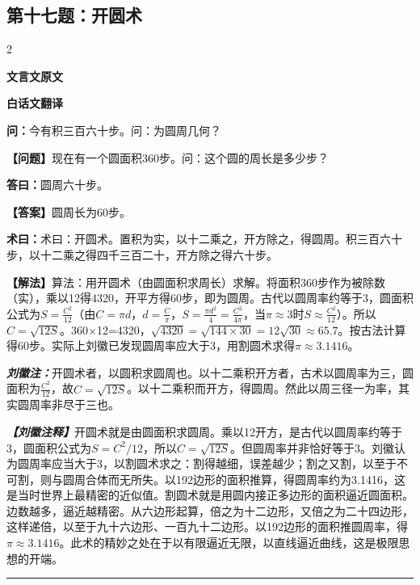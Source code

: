 \documentclass[10pt,a4paper]{article}
\newcommand{\wen}[1]{\textbf{\color{problemcolor}问：}#1\par}
\newcommand{\da}[1]{\textbf{答曰：}#1\par}
\newcommand{\shu}[1]{\textbf{术曰：}#1\par}
\newcommand{\liuhui}[1]{{\color{commentarycolor}\textit{\textbf{刘徽注：}}#1\par}}
\newcommand{\classicalheader}[1]{{\centering\large\bfseries\color{classicalcolor} #1\par\vspace{0.5em}}}
\newcommand{\wenmodern}[1]{\textbf{\color{moderncolor}【问题】}#1\par}
\newcommand{\damodern}[1]{\textbf{【答案】}#1\par}
\newcommand{\shumodern}[1]{\textbf{【解法】}#1\par}
\newcommand{\liuhuimodern}[1]{{\color{commentarycolor}\textit{\textbf{【刘徽注释】}}#1\par}}
\newcommand{\modernheader}[1]{{\centering\large\bfseries\color{moderncolor} #1\par\vspace{0.5em}}}
\newcommand{\problemsec}[1]{\subsection*{#1}}
\begin{document}
\problemsec{第十七题：开圆术}
\begin{paracol}{2}
\classicalheader{文言文原文}
\switchcolumn
\modernheader{白话文翻译}
\switchcolumn*

\wen{今有积三百六十步。问：为圆周几何？}

\switchcolumn

\wenmodern{现在有一个圆面积360步。问：这个圆的周长是多少步？}

\switchcolumn*

\da{圆周六十步。}

\switchcolumn

\damodern{圆周长为60步。}

\switchcolumn*

\shu{术曰：开圆术。置积为实，以十二乘之，开方除之，得圆周。积三百六十步，以十二乘之得四千三百二十，开方除之得六十步。}

\switchcolumn

\shumodern{算法：用开圆术（由圆面积求周长）求解。将面积360步作为被除数（实），乘以12得4320，开平方得60步，即为圆周。古代以圆周率约等于3，圆面积公式为$S=\frac{C^2}{12}$（由$C=\pi d$，$d=\frac{C}{\pi}$，$S=\frac{\pi d^2}{4}=\frac{C^2}{4\pi}$，当$\pi\approx3$时$S\approx\frac{C^2}{12}$）。所以$C=\sqrt{12S}$。360×12=4320，$\sqrt{4320}=\sqrt{144\times30}=12\sqrt{30}\approx65.7$。按古法计算得60步。实际上刘徽已发现圆周率应大于3，用割圆术求得$\pi\approx3.1416$。}

\switchcolumn*

\liuhui{开圆术者，以圆积求圆周也。以十二乘积开方者，古术以圆周率为三，圆面积为$\frac{C^2}{12}$，故$C = \sqrt{12S}$。以十二乘积而开方，得圆周。然此以周三径一为率，其实圆周率非尽于三也。}

\switchcolumn

\liuhuimodern{开圆术就是由圆面积求圆周。乘以12开方，是古代以圆周率约等于3，圆面积公式为$S=C^2/12$，所以$C=\sqrt{12S}$。但圆周率并非恰好等于3。刘徽认为圆周率应当大于3，以割圆术求之：割得越细，误差越少；割之又割，以至于不可割，则与圆周合体而无所失。以192边形的面积推算，得圆周率约为3.1416，这是当时世界上最精密的近似值。割圆术就是用圆内接正多边形的面积逼近圆面积。边数越多，逼近越精密。从六边形起算，倍之为十二边形，又倍之为二十四边形，这样递倍，以至于九十六边形、一百九十二边形。以192边形的面积推圆周率，得$\pi\approx3.1416$。此术的精妙之处在于以有限逼近无限，以直线逼近曲线，这是极限思想的开端。}

\end{paracol}

\vspace{0.3cm}
\hrule
\vspace{0.3cm}
\end{document}

